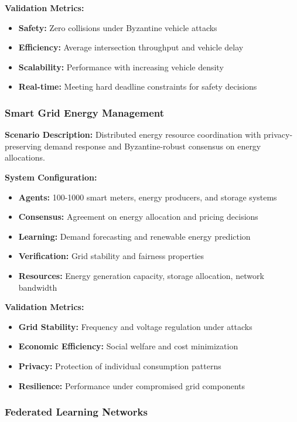 \documentclass[conference]{IEEEtran}
\begin{document}
\textbf{Validation Metrics:}
\begin{itemize}
    \item \textbf{Safety:} Zero collisions under Byzantine vehicle attacks
    \item \textbf{Efficiency:} Average intersection throughput and vehicle delay
    \item \textbf{Scalability:} Performance with increasing vehicle density
    \item \textbf{Real-time:} Meeting hard deadline constraints for safety decisions
\end{itemize}

\subsubsection{Smart Grid Energy Management}

\textbf{Scenario Description:} Distributed energy resource coordination with privacy-preserving demand response and Byzantine-robust consensus on energy allocations.

\textbf{System Configuration:}
\begin{itemize}
    \item \textbf{Agents:} 100-1000 smart meters, energy producers, and storage systems
    \item \textbf{Consensus:} Agreement on energy allocation and pricing decisions
    \item \textbf{Learning:} Demand forecasting and renewable energy prediction
    \item \textbf{Verification:} Grid stability and fairness properties
    \item \textbf{Resources:} Energy generation capacity, storage allocation, network bandwidth
\end{itemize}

\textbf{Validation Metrics:}
\begin{itemize}
    \item \textbf{Grid Stability:} Frequency and voltage regulation under attacks
    \item \textbf{Economic Efficiency:} Social welfare and cost minimization
    \item \textbf{Privacy:} Protection of individual consumption patterns
    \item \textbf{Resilience:} Performance under compromised grid components
\end{itemize}

\subsubsection{Federated Learning Networks}
\end{document}
